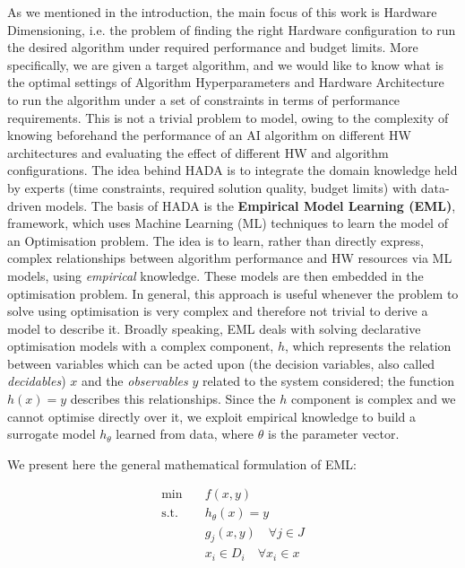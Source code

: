 \documentclass[a4paper,singleside,12pt]{report} %
\begin{document}
As we mentioned in the introduction, the main focus of this work is Hardware Dimensioning, i.e. the problem of finding the right 
Hardware configuration to run the desired algorithm under required performance and budget limits. More specifically, we are given a 
target algorithm, and we would like to know what is the optimal settings of Algorithm Hyperparameters and Hardware Architecture to
run the algorithm under a set of constraints in terms of performance requirements. This is not a trivial problem 
to model, owing to the complexity of knowing beforehand the performance of an AI algorithm on different HW architectures and 
evaluating the effect of different HW and algorithm configurations. The idea behind HADA is to integrate the domain knowledge held by experts 
(time constraints, required solution quality, budget limits) with data-driven models.
The basis of HADA is the \textbf{Empirical Model Learning (EML)}, \cite{LOMBARDI2017343} framework, which uses Machine Learning (ML) 
techniques to learn the model of an Optimisation problem. The idea is to learn, rather than directly express, complex relationships
between algorithm performance and HW resources via ML models, using \textit{empirical} knowledge. These models are then embedded in the optimisation problem. 
In general, this approach is useful whenever the problem to solve using optimisation is very complex and therefore not trivial 
to derive a model to describe it. Broadly speaking, EML deals with solving declarative optimisation models with a complex component, $h$, which represents 
the relation between variables which can be acted upon (the decision variables, also called \textit{decidables}) $x$ and 
the \textit{observables} $y$ related to the system considered; 
the function $h(x)=y$ describes this relationships. Since the $h$ component is complex and we cannot 
optimise directly over it, we exploit empirical knowledge to build a surrogate model $h_{\theta}$ learned from data, 
where $\theta$ is the parameter vector. 

We present here the general mathematical formulation of EML:

\begin{align}
    \min \quad & f(x, y) \label{eq:objective} \\
    \text{s.t.} \quad & h_{\theta}(x) = y \label{eq:surrogate} \\
    & g_j(x, y) \quad \forall j \in J \label{eq:constraints} \\
    & x_i \in D_i \quad \forall x_i \in x \label{eq:domain}
\end{align}
\end{document}
